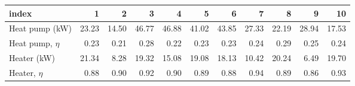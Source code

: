 \begin{tabular}{lrrrrrrrrrr}
\toprule
 index & 1 & 2 & 3 & 4 & 5 & 6 & 7 & 8 & 9 & 10 \\
\midrule
 Heat pump (kW) & 23.23 & 14.50 & 46.77 & 46.88 & 41.02 & 43.85 & 27.33 & 22.19 & 28.94 & 17.53 \\
Heat pump, $\eta$ & 0.23 & 0.21 & 0.28 & 0.22 & 0.23 & 0.23 & 0.24 & 0.29 & 0.25 & 0.24 \\
 Heater (kW) & 21.34 & 8.28 & 19.32 & 15.08 & 19.08 & 18.13 & 10.42 & 20.24 & 6.49 & 19.70 \\
 Heater, $\eta$ & 0.88 & 0.90 & 0.92 & 0.90 & 0.89 & 0.88 & 0.94 & 0.89 & 0.86 & 0.93 \\
\bottomrule
\end{tabular}
